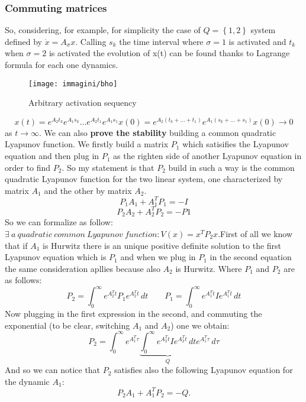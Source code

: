 \subsubsection{Commuting matrices}
So, considering, for example, for simplicity the case of $Q=\left\{1,2\right\}$ system defined by $\dot{x}=A_{\sigma}x$. Calling $s_k$ the time interval where $\sigma=1$ is activated and $t_k$ when $\sigma=2$ is activated the evolution of x(t) can be found thanks to Lagrange formula for each one dynamics.
\begin{figure}[H]
	\centering
	\texttt{[image: immagini/bho]}
	\caption{Arbitrary activation sequency}
	\label{fig:bho}
\end{figure}
\[
x(t)=e^{A_2t_k}e^{A_1s_k}\dots e^{A_2t_1}e^{A_1s_1}x(0)=e^{A_2(t_k+\dots +t_1)}e^{A_1(s_k+\dots +s_1)}x(0)\to 0
\] as $t\to\infty$.
We can also \textbf{prove the stability} building a common quadratic Lyapunov function. We firstly build a matrix $P_1$ which satisifies the Lyapunov equation and then plug in $P_1$ as the righten side of another Lyapunov equation in order to find $P_2$. So my statement is that $P_2$ build in such a way is the common quadratic Lyapunov function for the two linear system, one characterized by matrix $A_1$ and the other by matrix $A_2$.
\[
P_1A_1+A_1^TP_1=-I\]
\[
P_2A_2+A_2^TP_2=-P1
\]
So we can formalize as follow: $\exists\ a \ quadratic \ common \ Lyapunov \ function: V(x)=x^TP_2x$.First of all we know that if $A_1$ is Hurwitz there is an unique positive definite solution to the first Lyapunov equation which is $P_1$ and when we plug in $P_1$ in the second equation the same consideration apllies because also $A_2$ is Hurwitz. Where $P_1$ and $P_2$ are as follows:
\[P_2=\int_{0}^{\infty} e^{A_2^Tt}P_1e^{A_2^Tt}\, dt \qquad P_1=\int_{0}^{\infty} e^{A_1^Tt}Ie^{A_1^Tt}\, dt\]
Now plugging in the first expression in the second, and commuting the exponential (to be clear, switching $A_1$ and $A_2$) one we obtain: 
\[P_2=\int_{0}^{\infty} e^{A_1^T\tau}\underbrace{\int_{0}^{\infty} e^{A_2^Tt}Ie^{A_2^Tt}\, dt}_{Q}e^{A_1^T\tau}\, d\tau
\]
And so we can notice that $P_2$ satisfies also the following Lyapunov equation for the dynamic $A_1$:
\[
P_2A_1+A_1^TP_2=-Q.
\]
